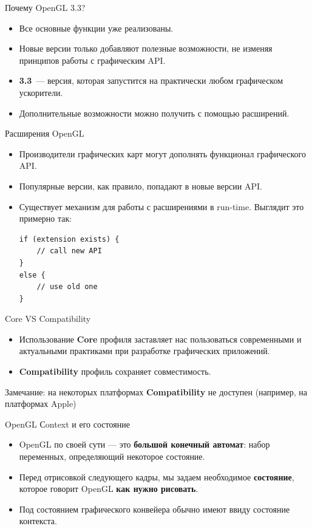 \documentclass[aspectration=1610,t]{beamer}
\begin{document}
\begin{frame}[fragile]{Почему OpenGL 3.3?}
    \begin{itemize}
        \item Все основные функции уже реализованы.
        \item Новые версии только добавляют полезные возможности,
            не изменяя принципов работы с графическим API.
        \item {\bf 3.3}~--- версия, которая запустится на практически 
            любом графическом ускорители.
        \item Дополнительные возможности можно получить с помощью расширений.
    \end{itemize}
\end{frame}

\begin{frame}[fragile]{Расширения OpenGL}
    \begin{itemize}
        \item Производители графических карт могут дополнять функционал графического API.
        \item Популярные версии, как правило, попадают в новые версии API.
        \item Существует механизм для работы с расширениями в run-time.
            Выглядит это примерно так:
            {\small \begin{lstlisting}
if (extension exists) {
    // call new API
}
else {
    // use old one
}
            \end{lstlisting}}
    \end{itemize}
\end{frame}

\begin{frame}[fragile]{Core VS Compatibility}
    \begin{itemize}
        \item Использование {\bf Core} профиля заставляет нас 
            пользоваться современными и актуальными практиками 
            при разработке графических приложений.
        \item {\bf Compatibility} профиль сохраняет совместимость.
    \end{itemize}
    Замечание: на некоторых платформах {\bf Compatibility} 
    не доступен (например, на платформах Apple)
\end{frame}

\begin{frame}[fragile]{OpenGL Сontext и его состояние}
    \begin{itemize}
        \item OpenGL по своей сути — это {\bf большой конечный автомат}: набор переменных, 
            определяющий некоторое состояние.
        \item Перед отрисовкой следующего кадры, мы задаем необходимое {\bf состояние}, 
            которое говорит OpenGL {\bf как нужно рисовать}.
        \item Под состоянием графического конвейера обычно имеют ввиду состояние контекста.
    \end{itemize}
\end{frame}
\end{document}
